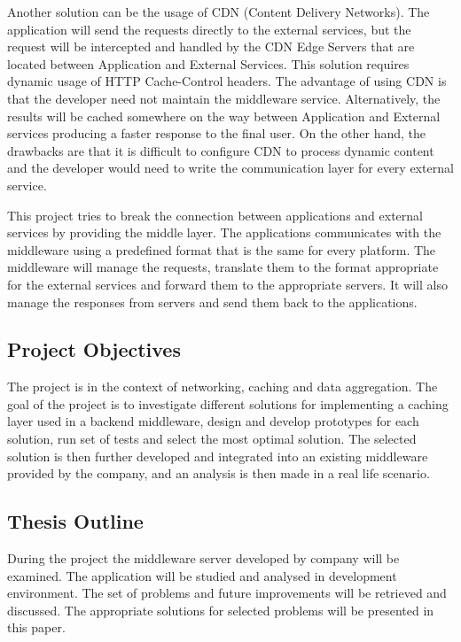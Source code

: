Another solution can be the usage of CDN (Content Delivery Networks). The application will send the requests directly to the external services, but the request will be intercepted and handled by the CDN Edge Servers that are located between Application and External Services. This solution requires dynamic usage of HTTP Cache-Control headers. The advantage of using CDN is that the developer need not maintain the middleware service. Alternatively, the results will be cached somewhere on the way between Application and External services producing a faster response to the final user. On the other hand, the drawbacks are that it is difficult to configure CDN to process dynamic content and the developer would need to write the communication layer for every external service. 

This project tries to break the connection between applications and external services by providing the middle layer. The applications communicates with the middleware using a predefined format that is the same for every platform. The middleware will manage the requests, translate them to the format appropriate for the external services and forward them to the appropriate servers. It will also manage the responses from servers and send them back to the applications.


\subsection{Project Objectives}

The project is in the context of networking, caching and data aggregation. The goal of the project is to investigate different solutions for implementing a caching layer used in a backend middleware, design and develop prototypes for each solution, run set of tests and select the most optimal solution.
The selected solution is then further developed and integrated into an existing middleware provided by the company, and an analysis is then made in a real life scenario.


\subsection{Thesis Outline}

During the project the middleware server developed by company will be examined. The application will be studied and analysed in development environment. The set of problems and future improvements will be retrieved and discussed. The appropriate solutions for selected problems will be presented in this paper.

